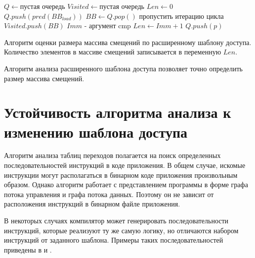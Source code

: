 \documentclass{mipt-thesis-bs}
\begin{document}
    \begin{algorithm}[h]
    \begin{algorithmic}
        \State $Q \gets \text{пустая очередь}$
        \State $Visited \gets \text{пустая очередь}$
        \State $Len \gets 0$
        \State $Q.push(pred(BB_{load}))$
            \State $BB \gets Q.pop()$
                \State пропустить итерацию цикла %
            \EndIf
            \State $Visited.push(BB)$
                        \State $Imm$ - аргумент cmp
                        \State $Len \gets Imm + 1$
                        \State \Return
                    \EndIf
                \EndFor
            \Else
                        \State $Q.push(p)$
                    \EndIf
                \EndFor
            \EndIf
        \EndWhile
    \end{algorithmic}
    \caption{Алгоритм оценки размера массива смещений по расширенному шаблону доступа. Количество элементов в массиве смещений записывается в переменную $Len$.}
    \label{alg:cmp_estimate}
    \end{algorithm}

    Алгоритм анализа расширенного шаблона доступа позволяет точно определить размер массива смещений.

    \section{Устойчивость алгоритма анализа к изменению шаблона доступа} \label{sec:stability-analysis}
    Алгоритм анализа таблиц переходов полагается на поиск определенных последовательностей инструкций в коде приложения. В общем случае, искомые инструкции могут располагаться в бинарном коде приложения произвольным образом. Однако алгоритм работает с представлением программы в форме графа потока управления и графа потока данных. Поэтому он не зависит от расположения инструкций в бинарном файле приложения.

    В некоторых случаях компилятор может генерировать последовательности инструкций, которые реализуют ту же самую логику, но отличаются набором инструкций от заданного шаблона. Примеры таких последовательностей приведены в  и .
\end{document}

